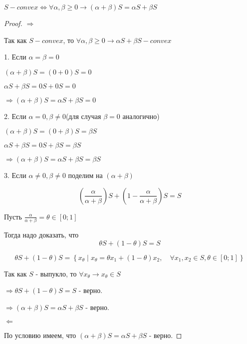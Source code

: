 \documentclass[a4paper,12pt]{article}
\newcommand{\lt}{\left}
\newcommand{\rt}{\right}
\begin{document}
$S - convex \Leftrightarrow \forall \alpha,\beta \geq 0 \rightarrow (\alpha + \beta)S = \alpha S + \beta S$

\begin{proof}

$\Longrightarrow$

Так как $S - convex$, то $\forall \alpha,\beta \geq 0 \rightarrow \alpha S + \beta S - convex$
\vspace{\baselineskip}

1. Если $\alpha = \beta = 0$

$ (\alpha + \beta)S = (0+0)S = 0$
 
$\alpha S + \beta S = 0S + 0S = 0$

$\Rightarrow  (\alpha + \beta)S = \alpha S + \beta S = 0$
\vspace{\baselineskip}

2. Если $\alpha=0, \beta \neq 0$(для случая $\beta = 0$ аналогично)

$(\alpha + \beta)S = (0 + \beta)S = \beta S$

$\alpha S + \beta S = 0S + \beta S = \beta S$

$\Rightarrow  (\alpha + \beta)S = \alpha S + \beta S = \beta S$

\vspace{\baselineskip}
3. Если $\alpha \neq 0, \beta \neq0$ поделим на $(\alpha + \beta)$

\[
\lt(\frac{\alpha}{\alpha+\beta}\rt)S + \lt(1 - \frac{\alpha}{\alpha+\beta}\rt)S=S
\]

Пусть $ \frac{\alpha}{\alpha+\beta} = \theta \in [0;1]$

Тогда надо доказать, что 
\[
\theta S + \lt(1 - \theta\rt)S=S
\]


\begin{equation}
\theta S + \lt(1 - \theta\rt)S = \lt\{x_\theta \mid x_\theta =  \theta x_1+\lt(1-\theta\rt)x_2,\quad \forall x_1,x_2 \in S, \theta \in [0;1] \rt\}
\end{equation}

Так как $S$ - выпукло, то $\forall x_\theta \rightarrow x_\theta \in S$ 

$\Rightarrow \theta S + \lt(1 - \theta\rt)S=S$ - верно.

$\Rightarrow (\alpha + \beta)S = \alpha S + \beta S$ - верно.

\vspace{\baselineskip}

$\Longleftarrow$

По условию имеем, что  $(\alpha + \beta)S = \alpha S + \beta S$ - верно.


\end{proof}
\end{document}
